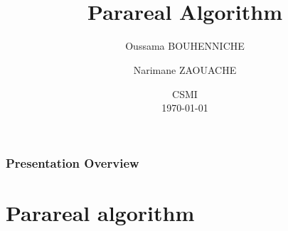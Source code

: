 \documentclass[
	11pt,
]{beamer}
\title[Parareal Algorithm]{\\ \textbf{Parareal Algorithm}}
\author[O. BOUHENNICHE \and N. ZAOUACHE]{Oussama BOUHENNICHE \and Narimane ZAOUACHE}
\institute[]{University of Strasbourg}
\date[\today]{ CSMI \\ \today}
\begin{document}

\begin{frame}
	\titlepage
\end{frame}


\begin{frame}
	\frametitle{Presentation Overview}

	\tableofcontents
\end{frame}


\section{Parareal algorithm}
\end{document}
